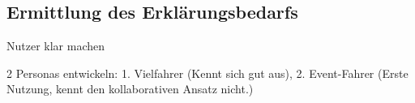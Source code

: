 \subsection{Ermittlung des Erklärungsbedarfs}

Nutzer klar machen

2 Personas entwickeln: 1. Vielfahrer (Kennt sich gut aus), 2. Event-Fahrer (Erste Nutzung, kennt den kollaborativen Ansatz nicht.)

